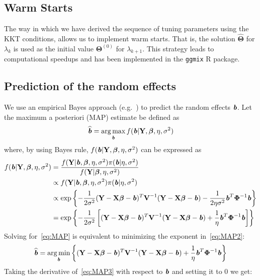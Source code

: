\documentclass[12pt,letter]{article}\usepackage[]{graphicx}\usepackage[]{color}
\newcommand{\bX}{\textbf{X}}
\newcommand{\bY}{\textbf{Y}}
\newcommand{\bV}{\textbf{V}}
\newcommand{\bb}{\textbf{\emph{b}}}
\newcommand{\bTheta}{\boldsymbol{\Theta}}
\newcommand{\bbeta}{\boldsymbol{\beta}}
\newcommand{\bPhi}{\boldsymbol{\Phi}}
\DeclareMathOperator*{\argmin}{arg\,min}
\DeclareMathOperator*{\argmax}{arg\,max}
\begin{document}
\subsection{Warm Starts}
The way in which we have derived the sequence of tuning parameters using the KKT conditions, allows us to implement warm starts. That is, the solution $\widehat{\bTheta}$ for $\lambda_k$ is used as the initial value $\bTheta^{(0)}$ for $\lambda_{k+1}$. This strategy leads to computational speedups and has been implemented in the \texttt{ggmix} R package.

\subsection{Prediction of the random effects}
We use an empirical Bayes approach (e.g.~\cite{wakefield2013bayesian}) to predict the random effects $\bb$. Let the maximum a posteriori (MAP) estimate be defined as
\begin{equation}
	\widehat{\bb} = \argmax_{\bb} f(\bb |  \bY, \bbeta, \eta, \sigma^2)  \label{eq:MAP}
\end{equation}
where, by using Bayes rule, $f(\bb |  \bY, \bbeta, \eta, \sigma^2)$ can be expressed as
\begin{align}
	f(\bb |  \bY, \bbeta, \eta, \sigma^2) & = \frac{f(\bY | \bb,  \bbeta, \eta, \sigma^2)  \pi(\bb | \eta, \sigma^2)}{f(\bY |  \bbeta, \eta, \sigma^2)} \nonumber \\
	& \propto f(\bY | \bb,  \bbeta, \eta, \sigma^2)  \pi(\bb | \eta, \sigma^2) \nonumber\\
	& \propto \exp \left\lbrace - \frac{1}{2 \sigma^2} (\bY - \bX \bbeta - \bb)^T \bV^{-1} (\bY - \bX \bbeta - \bb) - \frac{1}{2\eta \sigma^2}\bb^T \bPhi^{-1}\bb   \right \rbrace \nonumber\\
	& = \exp \left\lbrace - \frac{1}{2 \sigma^2} \left[  (\bY - \bX \bbeta - \bb)^T \bV^{-1} (\bY - \bX \bbeta - \bb) + \frac{1}{\eta }\bb^T \bPhi^{-1}\bb \right]    \right \rbrace \label{eq:MAP2}
\end{align}
Solving for~\eqref{eq:MAP} is equivalent to minimizing the exponent in~\eqref{eq:MAP2}:
\begin{align}
	\widehat{\bb} = \argmin_{\bb} \left\lbrace  (\bY - \bX \bbeta - \bb)^T \bV^{-1} (\bY - \bX \bbeta - \bb) + \frac{1}{\eta }\bb^T \bPhi^{-1}\bb \right\rbrace \label{eq:MAP3}
\end{align}
Taking the derivative of~\eqref{eq:MAP3} with respect to $\bb$ and setting it to 0 we get:
\end{document}
